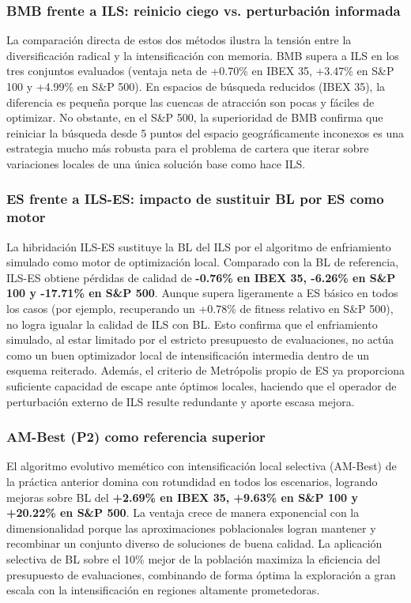 \subsubsection*{BMB frente a ILS: reinicio ciego vs. perturbación informada}

La comparación directa de estos dos métodos ilustra la tensión entre la diversificación radical y la intensificación con memoria. BMB supera a ILS en los tres conjuntos evaluados (ventaja neta de +0.70\% en IBEX 35, +3.47\% en S\&P 100 y +4.99\% en S\&P 500). En espacios de búsqueda reducidos (IBEX 35), la diferencia es pequeña porque las cuencas de atracción son pocas y fáciles de optimizar. No obstante, en el S\&P 500, la superioridad de BMB confirma que reiniciar la búsqueda desde 5 puntos del espacio geográficamente inconexos es una estrategia mucho más robusta para el problema de cartera que iterar sobre variaciones locales de una única solución base como hace ILS.

\subsubsection*{ES frente a ILS-ES: impacto de sustituir BL por ES como motor}

La hibridación ILS-ES sustituye la BL del ILS por el algoritmo de enfriamiento simulado como motor de optimización local. Comparado con la BL de referencia, ILS-ES obtiene pérdidas de calidad de \textbf{-0.76\% en IBEX 35, -6.26\% en S\&P 100 y -17.71\% en S\&P 500}. Aunque supera ligeramente a ES básico en todos los casos (por ejemplo, recuperando un +0.78\% de fitness relativo en S\&P 500), no logra igualar la calidad de ILS con BL. Esto confirma que el enfriamiento simulado, al estar limitado por el estricto presupuesto de evaluaciones, no actúa como un buen optimizador local de intensificación intermedia dentro de un esquema reiterado. Además, el criterio de Metrópolis propio de ES ya proporciona suficiente capacidad de escape ante óptimos locales, haciendo que el operador de perturbación externo de ILS resulte redundante y aporte escasa mejora.

\subsubsection*{AM-Best (P2) como referencia superior}

El algoritmo evolutivo memético con intensificación local selectiva (AM-Best) de la práctica anterior domina con rotundidad en todos los escenarios, logrando mejoras sobre BL del \textbf{+2.69\% en IBEX 35, +9.63\% en S\&P 100 y +20.22\% en S\&P 500}. La ventaja crece de manera exponencial con la dimensionalidad porque las aproximaciones poblacionales logran mantener y recombinar un conjunto diverso de soluciones de buena calidad. La aplicación selectiva de BL sobre el 10\% mejor de la población maximiza la eficiencia del presupuesto de evaluaciones, combinando de forma óptima la exploración a gran escala con la intensificación en regiones altamente prometedoras.


